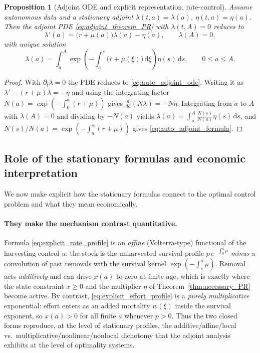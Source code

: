 \documentclass[pdflatex,sn-mathphys-num]{sn-jnl}
\newtheorem{proposition}[theorem]{Proposition}
\theoremstyle{definition}
\theoremstyle{remark}
\newcommand{\dd}{\,\mathrm{d}}
\begin{document}
\begin{proposition}[Adjoint ODE and explicit representation, rate-control]
\label{prop:explicit_adjoint}
Assume autonomous data and a stationary adjoint $\lambda(t,a)=\lambda(a)$,
$\eta(t,a)=\eta(a)$. Then the adjoint PDE
\eqref{eq:adjoint_theorem_PR} with $\lambda(t,A)=0$ reduces to
\begin{equation}\label{eq:auto_adjoint_ode}
\lambda'(a)=\bigl(r+\mu(a)\bigr)\lambda(a)-\eta(a),\qquad\lambda(A)=0,
\end{equation}
with unique solution
\begin{equation}\label{eq:auto_adjoint_formula}
\lambda(a)=\int_a^A\exp\!\left(-\int_a^s\bigl(r+\mu(\xi)\bigr)\dd\xi\right)
\eta(s)\dd s,\qquad 0\le a\le A.
\end{equation}
\end{proposition}
\begin{proof}
With $\partial_t\lambda=0$ the PDE reduces to \eqref{eq:auto_adjoint_ode}.
Writing it as $\lambda'-(r+\mu)\lambda=-\eta$ and using the integrating factor
$N(a)=\exp(-\int_0^a(r+\mu))$ gives $\frac{d}{da}(N\lambda)=-N\eta$.
Integrating from $a$ to $A$ with $\lambda(A)=0$ and dividing by $-N(a)$ yields
$\lambda(a)=\int_a^A\frac{N(s)}{N(a)}\eta(s)\dd s$, and
$N(s)/N(a)=\exp(-\int_a^s(r+\mu))$ gives \eqref{eq:auto_adjoint_formula}.
\end{proof}


\subsection{Role of the stationary formulas and economic interpretation}
\label{subsec:stationary_role}

We now make explicit how the stationary formulas connect to the optimal
control problem and what they mean economically.

\paragraph{They make the mechanism contrast quantitative.}
Formula \eqref{eq:explicit_rate_profile} is an \emph{affine} (Volterra-type)
functional of the harvesting control $u$: the stock is the unharvested
survival profile $p\,e^{-\int_0^a\mu}$ \emph{minus} a convolution of past
removals with the survival kernel $\exp(-\int_s^a\mu)$. Removal acts
\emph{additively} and can drive $x(a)$ to zero at finite age, which is exactly
where the state constraint $x\ge0$ and the multiplier $\eta$ of
Theorem~\ref{thm:necessary_PR} become active. By contrast,
\eqref{eq:explicit_effort_profile} is a \emph{purely multiplicative}
exponential: effort enters as an added mortality $w(\xi)$ inside the survival
exponent, so $x(a)>0$ for all finite $a$ whenever $p>0$. Thus the two
closed forms reproduce, at the level of stationary profiles, the
additive/affine/local vs.\ multiplicative/nonlinear/nonlocal dichotomy that
the adjoint analysis exhibits at the level of optimality systems.
\end{document}
